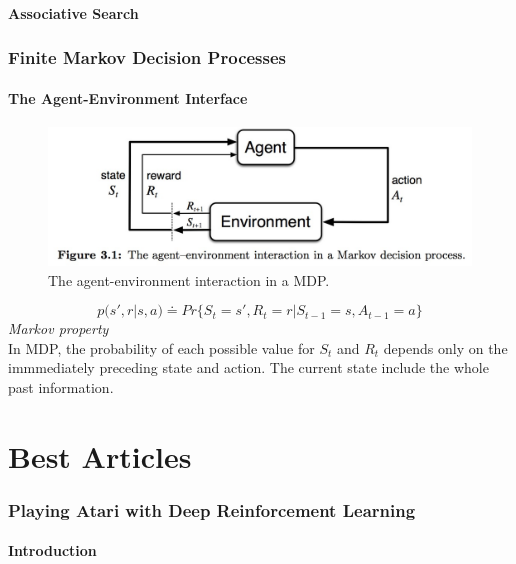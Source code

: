 \documentclass{article}
\numberwithin{equation}{section}
\numberwithin{figure}{section}
\begin{document}
\subsection{Associative Search}

\section{Finite Markov Decision Processes}
\subsection{The Agent-Environment Interface}
\begin{figure}
\includegraphics[width = \textwidth]{fig_3.1}
\caption{The agent-environment interaction in a MDP.}
\end{figure}

\begin{equation*}
p(s',r|s,a) \doteq Pr\{S_t=s',R_t=r | S_{t-1}=s,A_{t-1}=a\}
\end{equation*}
\textit{Markov property}\\
In MDP, the probability of each possible value for $S_t$ and $R_t$ depends only on the immmediately preceding state and action. The current state include the whole past information.








\part{Best Articles}
\section{Playing Atari with Deep Reinforcement Learning}
\subsection{Introduction}
\end{document}
